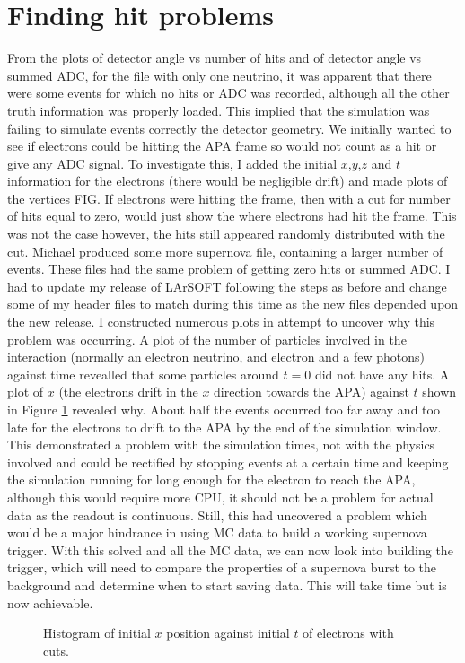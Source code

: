 \documentclass[a4paper,12,oneside,notitlepage]{report}
\begin{document}
\section*{\fontsize{11}{11}\selectfont Finding hit problems}
From the plots of detector angle vs number of hits and of detector angle vs summed ADC, for the file with only one neutrino, it was apparent that there were some events for which no hits or ADC was recorded, although all the other truth information was properly loaded. This implied that the simulation was failing to simulate events correctly the detector geometry. We initially wanted to see if electrons could be hitting the APA frame so would not count as a hit or give any ADC signal. To investigate this, I added the initial $x$,$y$,$z$ and $t$ information for the electrons (there would be negligible drift) and made plots of the vertices FIG. If electrons were hitting the frame, then with a cut for number of hits equal to zero, would just show the where electrons had hit the frame. This was not the case however, the hits still appeared randomly distributed with the cut. Michael produced some more supernova file, containing a larger number of events. These files had the same problem of getting zero hits or summed ADC. I had to update my release of LArSOFT following the steps as before and change some of my header files to match during this time as the new files depended upon the new release. I constructed numerous plots in attempt to uncover why this problem was occurring. A plot of the number of particles involved in the interaction (normally an electron neutrino, and electron and a few photons) against time revealled that some particles around $t=0$ did not have any hits. A plot of $x$ (the electrons drift in the $x$ direction towards the APA) against $t$ shown in Figure \ref{fig:xVtHisto} revealed why. About half the events occurred too far away and too late for the electrons to drift to the APA by the end of the simulation window. This demonstrated a problem with the simulation times, not with the physics involved and could be rectified by stopping events at a certain time and keeping the simulation running for long enough for the electron to reach the APA, although this would require more CPU, it should not be a problem for actual data as the readout is continuous. Still, this had uncovered a problem which would be a major hindrance in using MC data to build a working supernova trigger. With this solved and all the MC data, we can now look into building the trigger, which will need to compare the properties of a supernova burst to the background and determine when to start saving data. This will take time but is now achievable.
\begin{figure} [H]
\begin{center}
\caption{Histogram of initial $x$ position against initial $t$ of electrons with cuts. \label{fig:xVtHisto}}
\end{center}
\end{figure}
\end{document}
